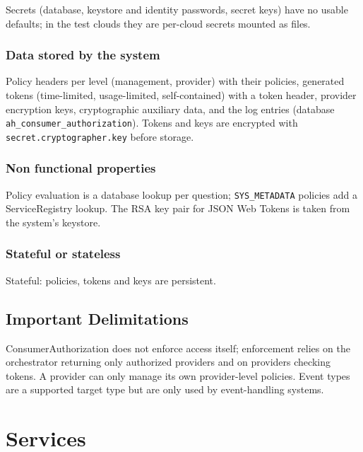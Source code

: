 \documentclass[a4paper]{arrowhead}
\begin{document}
Secrets (database, keystore and identity passwords, secret keys) have no usable defaults; in the test clouds they are per-cloud secrets mounted as files.

\subsubsection{Data stored by the system}

Policy headers per level (management, provider) with their policies, generated tokens (time-limited, usage-limited, self-contained) with a token header, provider encryption keys, cryptographic auxiliary data, and the log entries (database \texttt{ah\_\allowbreak{}consumer\_\allowbreak{}authorization}). Tokens and keys are encrypted with \texttt{secret.\allowbreak{}cryptographer.\allowbreak{}key} before storage.

\subsubsection{Non functional properties}

Policy evaluation is a database lookup per question; \texttt{SYS\_\allowbreak{}METADATA} policies add a ServiceRegistry lookup. The RSA key pair for JSON Web Tokens is taken from the system's keystore.

\subsubsection{Stateful or stateless}

Stateful: policies, tokens and keys are persistent.

\subsection{Important Delimitations}
\label{sec:delimitations}

Consumer\allowbreak{}Authorization does not enforce access itself; enforcement relies on the orchestrator returning only authorized providers and on providers checking tokens. A provider can only manage its own provider-level policies. Event types are a supported target type but are only used by event-handling systems.

\newpage

\section{Services}
\label{sec:services}
\end{document}
